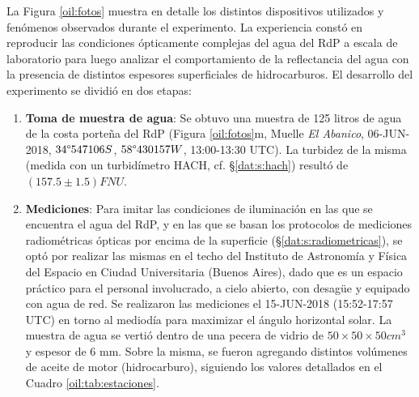     La Figura \ref{oil:fotos} muestra en detalle los distintos dispositivos utilizados y fenómenos observados durante el experimento. La experiencia constó en reproducir las condiciones ópticamente complejas del agua del RdP a escala de laboratorio para luego analizar el comportamiento de la reflectancia del agua con la presencia de distintos espesores superficiales de hidrocarburos. El desarrollo del experimento se dividió en dos etapas:
    \begin{enumerate}
        \item \textbf{Toma de muestra de agua}: Se obtuvo una muestra de 125 litros de agua de la costa porteña del RdP (Figura \ref{oil:fotos}m, Muelle \textit{El Abanico}, 06-JUN-2018, $34\degree 547106S$, $58\degree 430157W$, 13:00-13:30 UTC). La turbidez de la misma (medida con un turbidímetro HACH, cf. \S \ref{dat:s:hach}) resultó de $(157.5\pm1.5) FNU$.
        \item \textbf{Mediciones}: Para imitar las condiciones de iluminación en las que se encuentra el agua del RdP, y en las que se basan los protocolos de mediciones radiométricas ópticas por encima de la superficie (\S \ref{dat:s:radiometricas}), se optó por realizar las mismas en el techo del Instituto de Astronomía y Física del Espacio en Ciudad Universitaria (Buenos Aires), dado que es un espacio práctico para el personal involucrado, a cielo abierto, con desagüe y equipado con agua de red. Se realizaron las mediciones el 15-JUN-2018 (15:52-17:57 UTC) en torno al mediodía para maximizar el ángulo horizontal solar. La muestra de agua se vertió dentro de una pecera de vidrio de $50 \times 50 \times 50 cm^{3}$ y espesor de 6 mm. Sobre la misma, se fueron agregando distintos volúmenes de aceite de motor (hidrocarburo), siguiendo los valores detallados en el Cuadro \ref{oil:tab:estaciones}.
    \end{enumerate}

